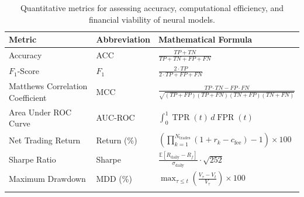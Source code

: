 
\begin{table}[htbp]
\caption{Quantitative metrics for assessing accuracy, computational efficiency, and financial viability of neural models.}
\label{tab:metrics_formulation}
\centering
\small
\setlength{\tabcolsep}{4pt}
\begin{tabularx}{\textwidth}{@{}L l L@{}}
\toprule
Metric & Abbreviation & Mathematical Formula \\
\midrule
Accuracy & ACC & $\frac{TP + TN}{TP + TN + FP + FN}$ \\
$F_1$-Score & $F_1$ & $\frac{2 \cdot TP}{2 \cdot TP + FP + FN}$ \\
Matthews Correlation Coefficient & MCC & $\frac{TP \cdot TN - FP \cdot FN}{\sqrt{(TP+FP)(TP+FN)(TN+FP)(TN+FN)}}$ \\
Area Under ROC Curve & AUC-ROC & $\int_0^1 \operatorname{TPR}(t) \, d\operatorname{FPR}(t)$ \\
Net Trading Return & Return (\%) & $\left( \prod_{k=1}^{N_{\text{trades}}} (1 + r_k - c_{\text{fee}}) - 1 \right) \times 100$ \\
Sharpe Ratio & Sharpe & $\frac{\mathbb{E}[R_{\text{daily}} - R_f]}{\sigma_{\text{daily}}} \cdot \sqrt{252}$ \\
Maximum Drawdown & MDD (\%) & $\max_{\tau \le t} \left( \frac{V_\tau - V_t}{V_\tau} \right) \times 100$ \\
\botrule
\end{tabularx}
\end{table}
